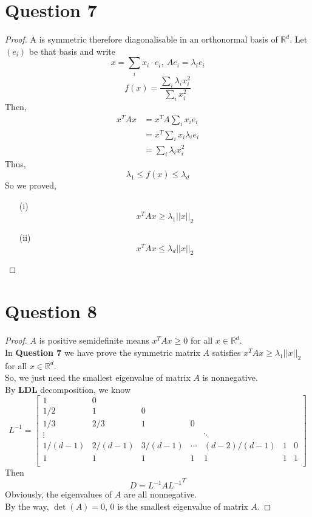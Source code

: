 \documentclass{article}
\begin{document}
\section*{Question 7}
    \begin{proof}
        A is symmetric therefore diagonalisable in an orthonormal basis of $\mathbb{R}^d$. Let $(e_i)$ be that basis and write
        $$x = \sum_i x_i\cdot e_i,\ Ae_i = \lambda_i e_i$$
        $$f(x)=\frac{\sum_i \lambda_i x_i^2}{\sum_i x_i^2}$$
        Then, \begin{align*}
            x^T A x &= x^T A \sum_i x_i e_i\\
            &= x^T \sum_i x_i \lambda_i e_i\\
            &= \sum_i \lambda_i x_i^2
        \end{align*}
        Thus, $$\lambda_1 \leqslant f(x) \leqslant \lambda_d$$
        So we proved, \begin{itemize}
            \item[(i)] $$x^T A x \geqslant \lambda_1 ||x||_2$$
            \item[(ii)] $$x^T A x \leqslant \lambda_d ||x||_2$$
        \end{itemize}
    \end{proof}

\section*{Question 8}
    \begin{proof}
        $A$ is positive semidefinite means $x^T A x \geqslant 0$ for all $x\in\mathbb{R}^d$.\\
        In \textbf{Question 7} we have prove the symmetric matrix $A$ satisfies $x^T A x \geqslant \lambda_1 ||x||_2$ for all $x\in\mathbb{R}^d$.\\
        So, we just need the smallest eigenvalue of matrix $A$ is nonnegative.\\
        By \textbf{LDL} decomposition, we know
        $$L^{-1} = \begin{bmatrix}
            1 & 0\\
            1/2 & 1 & 0\\
            1/3 & 2/3 & 1 & 0\\
            \vdots & & & & \ddots\\
            1/(d-1) & 2/(d-1) & 3/(d-1) & \cdots & (d-2)/(d-1) & 1 & 0\\
            1 & 1 & 1 & 1 & 1 & 1 & 1\\
        \end{bmatrix}$$
        Then $$D = L^{-1} A {L^{-1}}^{T}$$
        Obviously, the eigenvalues of $A$ are all nonnegative.\\
        By the way, $\det(A) = 0$, 0 is the smallest eigenvalue of matrix $A$.
    \end{proof}
\end{document}

